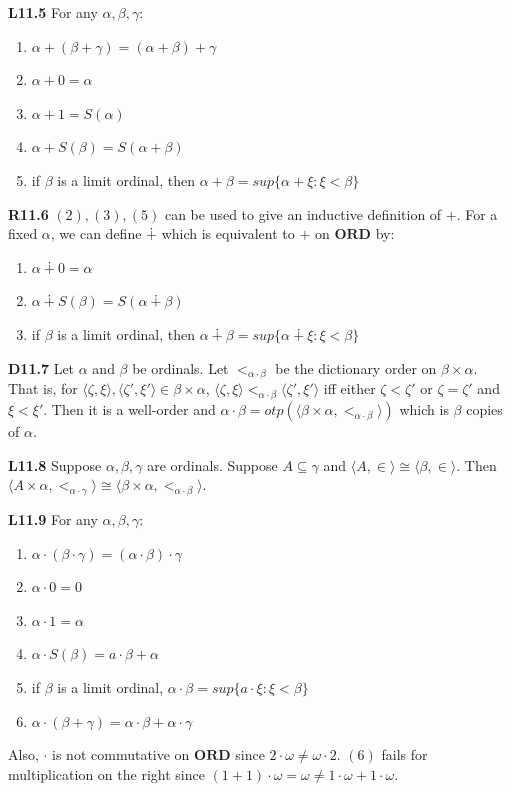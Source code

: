 \documentclass[10pt, landscape]{article}
\begin{document}
\begin{multicols*}{3}
\textbf{L11.5} For any $\alpha, \beta, \gamma$:
\begin{enumerate}
    \item $\alpha+(\beta+\gamma)=(\alpha+\beta)+\gamma$
    \item $\alpha+0=\alpha$
    \item $\alpha+1=S(\alpha)$
    \item $\alpha+S(\beta)=S(\alpha+\beta)$
    \item if $\beta$ is a limit ordinal, then $\alpha+\beta=sup\{\alpha+\xi:\xi<\beta\}$
\end{enumerate}

\textbf{R11.6} $(2), (3), (5)$ can be used to give an inductive definition of $+$. For a fixed $\alpha$, we can define $\dotplus$ which is equivalent to $+$ on $\mathbf{ORD}$ by:
\begin{enumerate}
    \item $\alpha\dotplus 0 = \alpha$
    \item $\alpha \dotplus S(\beta)=S(\alpha\dotplus\beta)$
    \item if $\beta$ is a limit ordinal, then $\alpha\dotplus\beta=sup\{\alpha\dotplus\xi:\xi<\beta\}$
\end{enumerate}

\textbf{D11.7} Let $\alpha$ and $\beta$ be ordinals. Let $<_{\alpha\cdot\beta}$ be the dictionary order on $\beta\times \alpha$. That is, for $\langle\zeta, \xi\rangle, \langle \zeta', \xi'\rangle\in\beta \times \alpha$, $\langle \zeta, \xi\rangle <_{\alpha\cdot\beta} \langle\zeta', \xi'\rangle$ iff either $\zeta<\zeta'$ or $\zeta=\zeta'$ and $\xi<\xi'$. Then it is a well-order and $\alpha\cdot\beta=otp(\langle \beta \times \alpha, <_{\alpha\cdot\beta}\rangle)$ which is $\beta$ copies of $\alpha$.

\textbf{L11.8} Suppose $\alpha, \beta, \gamma$ are ordinals. Suppose $A\subseteq\gamma$ and $\langle A, \in \rangle\cong\langle\beta,\in\rangle$. Then $\langle A\times \alpha, <_{\alpha\cdot\gamma}\rangle\cong\langle \beta \times\alpha, <_{\alpha\cdot\beta}\rangle$.

\textbf{L11.9} For any $\alpha, \beta, \gamma$:
\begin{enumerate}
    \item $\alpha \cdot (\beta \cdot \gamma)=(\alpha \cdot \beta)\cdot \gamma$
    \item $\alpha \cdot 0=0$
    \item $\alpha \cdot 1=\alpha$
    \item $\alpha \cdot S(\beta)=a\cdot\beta+\alpha$
    \item if $\beta$ is a limit ordinal, $\alpha\cdot\beta=sup\{a\cdot\xi:\xi<\beta\}$
    \item $\alpha \cdot(\beta+\gamma)=\alpha\cdot\beta+\alpha\cdot\gamma$
\end{enumerate}
Also, $\cdot$ is not commutative on $\mathbf{ORD}$ since $2\cdot \omega\neq\omega\cdot2$. $(6)$ fails for multiplication on the right since $(1+1)\cdot\omega=\omega\neq 1\cdot \omega+1\cdot\omega$.


\end{multicols*}
\end{document}
